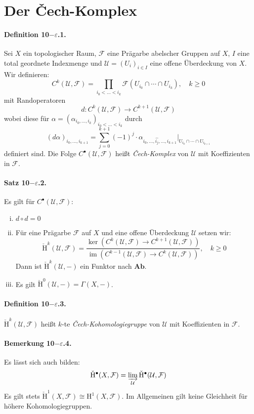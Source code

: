 \section{Der Čech-Komplex}

\paragraph{Definition 10$-\varepsilon$.1.}\label{9.5.1} Sei $X$ ein topologischer Raum, $\mathcal{F}$ eine Prägarbe abelscher Gruppen auf $X$, $I$ eine total geordnete Indexmenge und $\mathcal{U}=(U_i)_{i\in I}$ eine offene Überdeckung von $X$. Wir definieren:
\[C^k(\mathcal{U},\mathcal{F})=\prod_{i_0<\ldots<i_k}\mathcal{F}(U_{i_0}\cap\cdots\cap U_{i_k}),\quad k\geq 0 \]
mit Randoperatoren
\[d: C^k(\mathcal{U},\mathcal{F})\to C^{k+1}(\mathcal{U},\mathcal{F}) \]
wobei diese für $\alpha=(\alpha_{i_0,\ldots,i_k})_{i_0<\ldots<i_k}$ durch
\[(d\alpha)_{i_0,\ldots,i_{k+1}} = \sum_{j=0}^{k+1} (-1)^j \cdot\alpha_{i_0,\ldots,\widehat{i_j},\ldots,i_{k+1}}|_{U_{i_0}\cap\cdots\cap U_{i_{k+1}}} \]
definiert sind. Die Folge $C^\bullet(\mathcal{U},\mathcal{F})$ heißt \textit{Čech-Komplex} von $\mathcal{U}$ mit Koeffizienten in $\mathcal{F}$.

\paragraph{Satz 10$-\varepsilon$.2.}\label{9.5.2} Es gilt für $C^\bullet(\mathcal{U},\mathcal{F})$:
\begin{enumerate}[(i)]
\item $d\circ d =0$
\item Für eine Prägarbe $\mathcal{F}$ auf $X$ und eine offene Überdeckung $\mathcal{U}$ setzen wir:
\[\check{\mathrm{H}}^k(\mathcal{U},\mathcal{F}) = \frac{\ker( C^k(\mathcal{U},\mathcal{F})\to C^{k+1}(\mathcal{U},\mathcal{F}) )}{\operatorname{im}(C^{k-1}(\mathcal{U},\mathcal{F})\to C^{k}(\mathcal{U},\mathcal{F}))},\quad k\geq 0 \]
Dann ist $\check{\mathrm{H}}^k(\mathcal{U},-)$ ein Funktor nach $\mathbf{Ab}$.
\item Es gilt $\check{\mathrm{H} }^0(\mathcal{U},-)=\Gamma(X,-)$.
\end{enumerate}

\paragraph{Definition 10$-\varepsilon$.3.}\label{9.5.3} $\check{\mathrm{H}}^k(\mathcal{U},\mathcal{F})$ heißt $k$-te \textit{Čech-Kohomologiegruppe} von $\mathcal{U}$ mit Koeffizienten in $\mathcal{F}$.

\paragraph{Bemerkung 10$-\varepsilon$.4.}\label{9.5.4} Es lässt sich auch bilden:
\[\check{\mathrm{H}}^\bullet(X,\mathcal{F}) = \varinjlim_{\mathcal{U}}\check{\mathrm{H}}^\bullet(\mathcal{U},\mathcal{F}) \]
Es gilt stets $\check{\mathrm{H}}^1(X,\mathcal{F})\cong \mathrm{H}^1(X,\mathcal{F})$. Im Allgemeinen gilt keine Gleichheit für höhere Kohomologiegruppen.